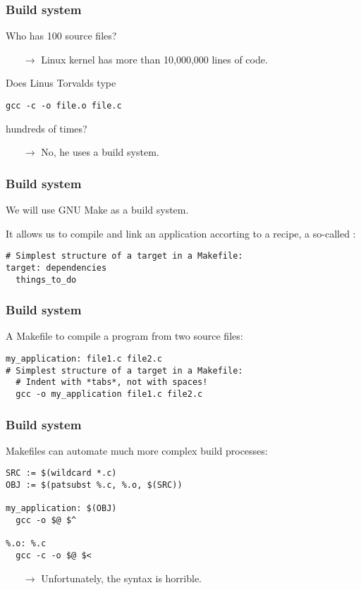 \documentclass[12pt,t]{beamer}
\let\emph\relax %
\newcommand{\conclude}[1]{%
  \begin{itemize}
    \item[$\rightarrow$]#1
  \end{itemize}
}
\newcommand{\cmd}[1]{\begin{center}\texttt{#1}\end{center}}
\begin{document}
  \begin{frame}[fragile]
    \frametitle{Build system}

    Who has 100 source files?
    \conclude{Linux kernel has more than 10,000,000 lines of code.}

    Does Linus Torvalds type
    \cmd{gcc -c -o file.o file.c}
    hundreds of times?

    \conclude{No, he uses a build system.}
  \end{frame}

  \begin{frame}[fragile]
    \frametitle{Build system}

    We will use GNU Make as a build system.

    It allows us to compile and link an application accorting to a recipe, a so-called \emph{Makefile}:

    \begin{lstlisting}[frame=single]
# Simplest structure of a target in a Makefile:
target: dependencies
  things_to_do
    \end{lstlisting}
  \end{frame}

  \begin{frame}[fragile]
    \frametitle{Build system}

    A Makefile to compile a program from two source files:

    \begin{lstlisting}[frame=single]
my_application: file1.c file2.c
# Simplest structure of a target in a Makefile:
  # Indent with *tabs*, not with spaces!
  gcc -o my_application file1.c file2.c
    \end{lstlisting}
  \end{frame}

  \begin{frame}[fragile]
    \frametitle{Build system}

    Makefiles can automate much more complex build processes:

    \begin{lstlisting}[frame=single]
SRC := $(wildcard *.c)
OBJ := $(patsubst %.c, %.o, $(SRC))

my_application: $(OBJ)
  gcc -o $@ $^

%.o: %.c
  gcc -c -o $@ $<
    \end{lstlisting}

    \conclude{Unfortunately, the syntax is horrible.}
  \end{frame}
\end{document}
